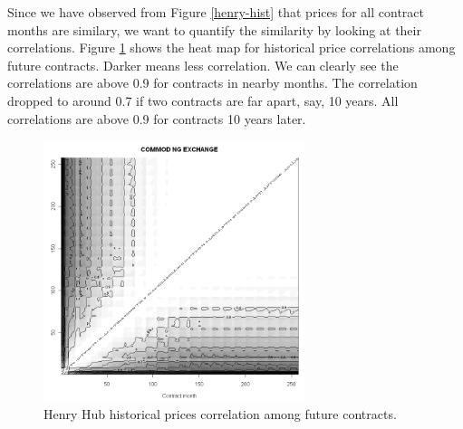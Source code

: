 Since we have observed from Figure \ref{henry-hist} that 
prices for all contract months are similary, we want to 
quantify the similarity by looking at their correlations. 
Figure \ref{henry-corr} shows the heat map for historical 
price correlations among future contracts. Darker means
less correlation. We can clearly see the correlations 
are above 0.9 for contracts in nearby months. The correlation
dropped to around 0.7 if two contracts are far apart, say, 
10 years. All correlations are above 0.9 for contracts 
10 years later. 
\begin{figure}[htbp]
\centering
\includegraphics[width=3in, height=3in]{figures/henry07.png}
\caption{Henry Hub historical prices correlation among future contracts.}
\label{henry-corr}
\end{figure}

